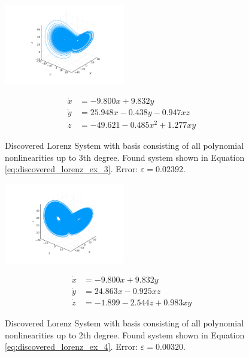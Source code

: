 \documentclass[10pt]{paper}
\begin{document}
\begin{figure}[H]
	\caption{Discovered Lorenz System with basis consisting of all polynomial nonlinearities up to 3th degree. Found system shown in Equation \ref{eq:discovered_lorenz_ex_3}. Error: $\varepsilon = 0.02392$.}
	\label{fig:found_lorenz_ex_3}

	\centering 
	\includegraphics[width = 0.47\textwidth, trim={4.3cm, 1.6cm, 4.3cm, 2.5cm}, clip]{lorenz_3_sol.pdf}

	\begin{equation}\label{eq:discovered_lorenz_ex_3}
		\begin{split}
			\dot x &= -9.800x + 9.832y \\ 
			\dot y &= 25.948x -0.438y  -0.947xz \\
			\dot z &= -49.621 -0.485x^2 + 1.277xy
		\end{split}
	\end{equation}
\end{figure}
\begin{figure}[H]
	\caption{Discovered Lorenz System with basis consisting of all polynomial nonlinearities up to 2th degree. Found system shown in Equation \ref{eq:discovered_lorenz_ex_4}. Error: $\varepsilon = 0.00320$.}
	\label{fig:found_lorenz_ex_4}

	\centering 
	\includegraphics[width = 0.47\textwidth, trim={4.3cm, 1.6cm, 4.3cm, 2.5cm}, clip]{lorenz_4_sol.pdf}

	\begin{equation}\label{eq:discovered_lorenz_ex_4}
		\begin{split}
			\dot x &= -9.800x + 9.832y \\ 
			\dot y &= 24.863x -0.925xz \\
			\dot z &= -1.899  -2.544z + 0.983xy
		\end{split}
	\end{equation}
\end{figure}
\end{document}
